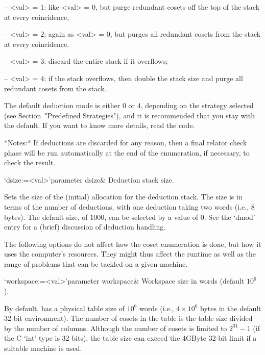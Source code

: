 \item{--} <val> = $1$: 
like <val> = $0$, but purge  redundant cosets off the top of the stack
at every coincidence,

\item{--} <val> = $2$: 
again as <val> = 0, but  purges all redundant cosets from the stack at
every coincidence.

\item{--} <val> = $3$:
 discard the entire stack if it overflows;

\item{--} <val> = $4$:
if  the stack  overflows, then  double the  stack size  and  purge all
redundant cosets from the stack.

\endlist

The  default deduction mode  is either  $0$ or  $4$, depending  on the
strategy  selected (see  Section~"Predefined Strategies"),  and  it is
recommended that you stay with the  default.  If you want to know more
details, read the code.

*Notes:*
If deductions are discarded for any reason, then a final relator check
phase  will be run  automatically at  the end  of the  enumeration, if
necessary, to check the result.

\>`dsize:=<val>'{parameter dsize}&
Deduction stack size.

Sets the  size of  the (initial) allocation  for the  deduction stack.
The size is  in terms of the number of  deductions, with one deduction
taking two words (i.e., 8 bytes).  The default size, of $1000$, can be
selected  by  a value  of  0.   See the  `dmod'  entry  for a  (brief)
discussion of deduction handling.


\enditems



The following options do not affect how the coset enumeration is done,
but how it  uses the computer's resources. They  might thus affect the
runtime as  well as  the range of  problems that  can be tackled  on a
given machine.

\beginitems

\>`workspace:=<val>'{parameter workspace}&
Workspace size in words (default $10^6$).


By default, {\ACE} has a physical table size of $10^6$ words (i.e., $4
\times 10^6$ bytes in the  default 32-bit environment).  The number of
cosets  in the  table  is the  table  size divided  by  the number  of
columns.  Although the  number of cosets is limited  to $2^{31}-1$ (if
the C `int'  type is 32 bits), the table size  can exceed the $4$GByte
32-bit limit if a suitable machine is used.


